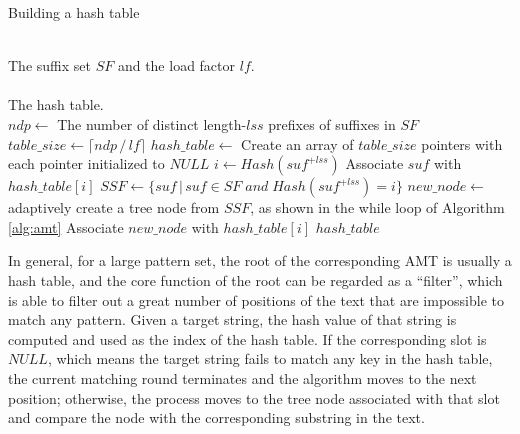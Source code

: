 \documentclass{article}
\begin{document}


\begin{algorithm}
  \caption{Building a hash table}\scriptsize
  \label{alg:hash}
  \begin{algorithmic}[1]
    \REQUIRE ~~\\
    The suffix set $SF$ and the load factor $lf$. \\
    \ENSURE ~~\\
    The hash table.\\
    \STATE
    \STATE $ndp \leftarrow$ The number of distinct length-$lss$
    prefixes of suffixes in $SF$
    \STATE $table\_size \leftarrow \lceil ndp\,/\,lf \rceil$
    \STATE $hash\_table \leftarrow$ Create an array  of
    $table\_size$ pointers with each pointer initialized to $NULL$
    \STATE
    \STATE $i \leftarrow Hash(suf^{+lss})$
    \STATE Associate $suf$ with $hash\_table[i]$
    \ENDFOR
    \STATE
    \STATE $SSF \leftarrow \{suf\,|\,suf\in SF\; and\; Hash(suf^{+lss})=i\}$
    \STATE $new\_node \leftarrow$ adaptively create a tree node from $SSF$, as shown in the \textsf{while} loop of Algorithm \ref{alg:amt}
    \STATE Associate $new\_node$ with $hash\_table[i]$
    \ENDIF
    \ENDFOR
    \STATE
    \RETURN $hash\_table$
  \end{algorithmic}
\end{algorithm}

In general, for a large pattern set, the root of the corresponding AMT
is usually a hash table, and the core function of the root can be
regarded as a ``filter'', which is able to filter out a great number
of positions of the text that are impossible to match any
pattern. Given a target string, the hash value of that string is
computed and used as the index of the hash table. If the corresponding
slot is $NULL$, which means the target string fails to match any key
in the hash table, the current matching round terminates and the
algorithm moves to the next position; otherwise, the process moves to
the tree node associated with that slot and compare the node with the
corresponding substring in the text.
\end{document}
